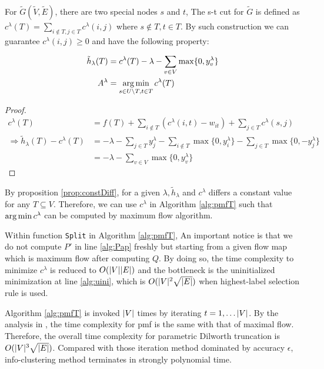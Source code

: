 \documentclass{article}
\begin{document}
For $\widetilde{G}(\widetilde{V}, \widetilde{E})$, there are two special nodes $s$ and $t$, The s-t cut for $\widetilde{G}$
is defined as $c^{\lambda}(T) = \sum_{i \not\in T, j \in T} c^{\lambda}(i,j)$ where $s \not\in T, t \in T$. By such construction we can guarantee $c^{\lambda}(i,j)\geq 0$ and have the following property:
\begin{proposition}\label{prop:constDiff}
	\begin{align}
		\tilde{h}_{\lambda}(T) &= c^{\lambda}(T) - \lambda - \sum_{v \in V} \max\{0, y^{\lambda}_v\}\\
	A^{\lambda}	&= \operatorname*{arg\,min}_{s\in U\backslash T, t\in T}c^{\lambda}(T) \label{eq:pmqe}
	\end{align}
\end{proposition}
\begin{proof}
	
	\begin{align*}
	c^{\lambda}(T) &= f(T) + \sum_{i \not\in T} (c^{\lambda}(i, t) - w_{it})+ \sum_{j \in T} c^{\lambda}(s,j) \\
	\Rightarrow \tilde{h}_{\lambda}(T) - c^{\lambda}(T) &= -\lambda - \sum_{j \in T} y^{\lambda}_j - \sum_{i \not\in T} \max\{0, y^{\lambda}_i\} - \sum_{j \in T} \max\{0,-y^{\lambda}_j\}\\
	&= -\lambda - \sum_{v \in V} \max\{0, y^{\lambda}_v\}
	\end{align*}
\end{proof}

By proposition \ref{prop:constDiff}, for a given $\lambda, \tilde{h}_{\lambda}$ and $c^{\lambda}$ differs a constant value for any $T\subseteq V$. Therefore, we can use $c^{\lambda}$ in Algorithm \ref{alg:pmfT} such that $\operatorname*{arg\,min} c^{\lambda}$ can be computed by maximum flow algorithm. 

Within function \texttt{Split} in Algorithm \ref{alg:pmfT}, An important notice is that we do not compute $P'$ in line \ref{alg:Pap} freshly but starting from a given flow map which is maximum flow after computing $Q$. By doing so, the time complexity to minimize $c^{\lambda}$ is reduced to $O(\lvert V\rvert\lvert E\rvert)$ and the bottleneck is the uninitialized minimization at line \ref{alg:uini}, which is $O(\lvert V\rvert^2\sqrt{\lvert E\rvert})$ when highest-label selection rule is used.

Algorithm \ref{alg:pmfT} is invoked $\lvert V\rvert$ times by iterating $t=1,\dots \lvert V\rvert$. By the analysis in \cite{RN17}, the time complexity for pmf is the same with that of maximal flow.
Therefore, the overall time complexity for parametric Dilworth truncation is $O(\lvert V\rvert^3\sqrt{\lvert E\rvert})$. Compared with those iteration method dominated by accuracy $\epsilon$, info-clustering method terminates in strongly polynomial time.
\end{document}
